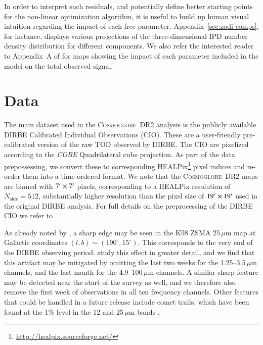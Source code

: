 \documentclass[twocolumn]{aa}
\newcommand{\cosmoglobe}{\textsc{Cosmoglobe}}
\begin{document}
In order to interpret such residuals, and potentially define better
starting points for the non-linear optimization algorithm, it is
useful to build up human visual intuition regarding the impact of each
free parameter. Appendix~\ref{sec:zodi-comps}, for instance, displays various projections 
of the three-dimensional IPD number density 
distribution for different components. We also refer the interested reader 
to Appendix~A of \citet{SanPhD} for maps showing the 
impact of each parameter included in the model on the total observed 
signal.





\section{Data}\label{sect:data}


The main dataset used in the \cosmoglobe\ DR2 analysis is the
publicly available DIRBE Calibrated Individual Observations
(CIO). These are a user-friendly pre-calibrated version of the raw TOD
observed by DIRBE. The CIO are pixelized according to the \textit{COBE}
Quadrilateral cube projection. As part of the data prepossessing, we
convert these to corresponding HEALPix\footnote{\url{http://healpix.sourceforge.net/}} 
\citep{healpix} pixel indices and re-order
them into a time-ordered format. We note that the \cosmoglobe\ DR2
maps are binned with $7\arcm \times 7\arcm$ pixels, corresponding to a
HEALPix resolution of $N_{\mathrm{side}}=512$, substantially 
higher resolution than the pixel size of $19\arcm \times 19\arcm$ used
in the original DIRBE analysis. For full details on the
preprocessing of the DIRBE CIO we refer to \cite{CG02_01}.

As already noted by \citet{kelsall1998}, a sharp edge may be seen in
the K98 ZSMA 25\,$\mu$m map at Galactic coordinates
$(l,b)\sim(190^{\circ},15^{\circ})$. This corresponds to the very end
of the DIRBE observing period. \citet{CG02_01} study this effect in
greater detail, and we find that this artifact may be mitigated by
omitting the last two weeks for the 1.25--3.5\,$\mu$m channels, and
the last month for the 4.9--100$\,\mu$m channels. A similar sharp
feature may be detected near the start of the survey as well, and we
therefore also remove the first week of observations in all ten frequency
channels. Other features that could be handled in a future release
include comet trails, which have been found at the 1\% level in the 12
and 25\,$\mu$m bands \citep{arendt}.
\end{document}
